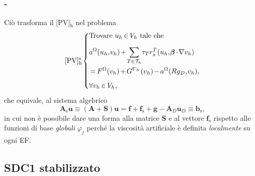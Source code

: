 \documentclass[11pt]{beamer}
\newcommand{\SpaziaturaMate}[3]{
    \setlength{\thinmuskip}{#1mu}
    \setlength{\medmuskip}{#2mu}
    \setlength{\thickmuskip}{#3mu}
}
\begin{document}
                \begin{frame}\frametitle{\titoloSez{} - \insertsubsection{}}
                    Ciò trasforma il {[PV]$_\text{h}$} nel problema
                    \begin{equation}
                        \SpaziaturaMate{1}{2}{3}
                        [\text{PV}]^\text{s}_\text{h}
                        \left\{
                        \begin{aligned}
                            &\text{Trovare }u_h\in V_h\text{ tale che}\\[5pt]
                            &a^\Omega(u_h,v_h)+\sum_{T\in\mathcal T_h}\tau_Tr^T_s(u_h,\boldsymbol\beta\cdot\nabla v_h)\\
                            &=F^\Omega(v_h)+G^{\Gamma_N}(v_h)-a^\Omega(Rg_D,v_h),\\[5pt]
                            &\forall v_h\in V_h,
                        \end{aligned}
                        \right.
                        \label{eqPVDiscretoStabilizzato}
                    \end{equation}
                    che equivale, al sistema algebrico
                    \begin{equation*}
                        \mathbf A_\text{s}\mathbf u\equiv
                        (\mathbf A+\mathbf S)\mathbf u=
                        \mathbf f+\mathbf f_\text{s}+\mathbf g-\mathbf A_D\mathbf u_D
                        \equiv\mathbf b_\text{s},
                        \label{eqSistemaAlgebricoStabilizzato}
                    \end{equation*}
                    in cui non è possibile dare una forma alla matrice $\mathbf S$ e al vettore $\mathbf f_\text{s}$ rispetto alle funzioni di base \textit{globali} $\varphi_j$ perché la viscosità artificiale è definita \textit{localmente} su ogni EF.
                \end{frame}

            \subsection{SDC1 stabilizzato}
\end{document}
